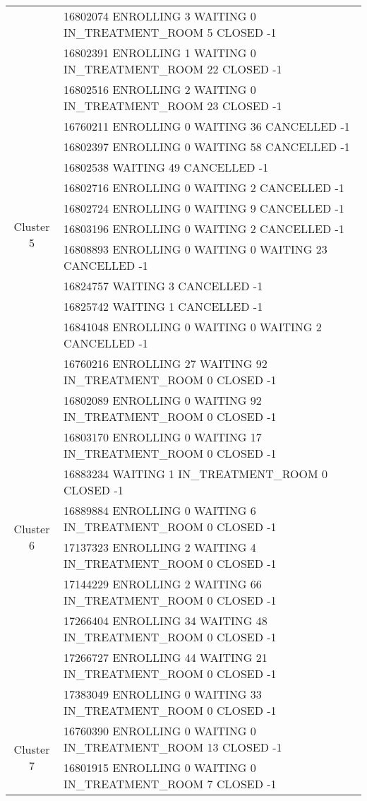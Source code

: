 {\begin{longtable}{|c|p{}|}
		& 16802074 ENROLLING 3 WAITING 0 IN\_TREATMENT\_ROOM 5 CLOSED -1 \\
		& 16802391 ENROLLING 1 WAITING 0 IN\_TREATMENT\_ROOM 22 CLOSED -1 \\
		& 16802516 ENROLLING 2 WAITING 0 IN\_TREATMENT\_ROOM 23 CLOSED -1 \\
		\hline
		\multirow{10}{*}{Cluster 5}
		& 16760211 ENROLLING 0 WAITING 36 CANCELLED -1 \\
		& 16802397 ENROLLING 0 WAITING 58 CANCELLED -1 \\
		& 16802538 WAITING 49 CANCELLED -1 \\
		& 16802716 ENROLLING 0 WAITING 2 CANCELLED -1 \\
		& 16802724 ENROLLING 0 WAITING 9 CANCELLED -1 \\
		& 16803196 ENROLLING 0 WAITING 2 CANCELLED -1 \\
		& 16808893 ENROLLING 0 WAITING 0 WAITING 23 CANCELLED -1 \\
		& 16824757 WAITING 3 CANCELLED -1 \\
		& 16825742 WAITING 1 CANCELLED -1 \\
		& 16841048 ENROLLING 0 WAITING 0 WAITING 2 CANCELLED -1 \\
		\hline
		\multirow{10}{*}{Cluster 6}
		& 16760216 ENROLLING 27 WAITING 92 IN\_TREATMENT\_ROOM 0 CLOSED -1 \\
		& 16802089 ENROLLING 0 WAITING 92 IN\_TREATMENT\_ROOM 0 CLOSED -1 \\
		& 16803170 ENROLLING 0 WAITING 17 IN\_TREATMENT\_ROOM 0 CLOSED -1 \\
		& 16883234 WAITING 1 IN\_TREATMENT\_ROOM 0 CLOSED -1 \\
		& 16889884 ENROLLING 0 WAITING 6 IN\_TREATMENT\_ROOM 0 CLOSED -1 \\
		& 17137323 ENROLLING 2 WAITING 4 IN\_TREATMENT\_ROOM 0 CLOSED -1 \\
		& 17144229 ENROLLING 2 WAITING 66 IN\_TREATMENT\_ROOM 0 CLOSED -1 \\
		& 17266404 ENROLLING 34 WAITING 48 IN\_TREATMENT\_ROOM 0 CLOSED -1 \\
		& 17266727 ENROLLING 44 WAITING 21 IN\_TREATMENT\_ROOM 0 CLOSED -1 \\
		& 17383049 ENROLLING 0 WAITING 33 IN\_TREATMENT\_ROOM 0 CLOSED -1 \\
		\hline
		\multirow{10}{*}{Cluster 7}
		& 16760390 ENROLLING 0 WAITING 0 IN\_TREATMENT\_ROOM 13 CLOSED -1 \\
		& 16801915 ENROLLING 0 WAITING 0 IN\_TREATMENT\_ROOM 7 CLOSED -1 \\

\end{longtable}}
